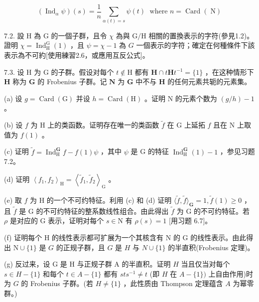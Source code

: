 \documentclass[10pt]{article}
\begin{document}
\[
\left( {{\operatorname{Ind}}_{\alpha }\psi }\right) \left( s\right)  = \frac{1}{n}\mathop{\sum }\limits_{{\alpha \left( t\right)  = s}}\psi \left( t\right) \;\text{ where }n = \operatorname{Card}\left( \mathrm{\;N}\right)
\]

7.2. 設 \(\mathrm{H}\) 為 \(\mathrm{G}\) 的一個子群，且令 \(\chi\) 為與 \(\mathrm{G}/\mathrm{H}\) 相關的置換表示的字符(參見1.2)。證明 \(\chi  = {\operatorname{Ind}}_{\mathrm{H}}^{\mathrm{G}}\left( 1\right)\) ，且 \(\psi  = \chi  - 1\) 為 \(G\) 一個表示的字符；確定在何種條件下該表示為不可約[使用練習2.6，或應用互反公式]。

7.3. 设 \(\mathrm{H}\) 为 \(\mathrm{G}\) 的子群。假设对每个 \(t \notin  \mathrm{H}\) 都有 \(\mathbf{H} \cap  t\mathbf{H}{t}^{-1} = \{ 1\}\) ，在这种情形下 \(\mathbf{H}\) 称为 \(\mathbf{G}\) 的 Frobenius 子群。记 \(\mathbf{N}\) 为 \(\mathbf{G}\) 中不与 \(\mathbf{H}\) 的任何元素共轭的元素集。

(a) 设 \(g = \operatorname{Card}\left( \mathrm{G}\right)\) 并设 \(h = \operatorname{Card}\left( \mathrm{H}\right)\) 。证明 \(\mathrm{N}\) 的元素个数为 \(\left( {g/h}\right)  - 1\) 。

(b) 设 \(f\) 为 \(\mathrm{H}\) 上的类函数。证明存在唯一的类函数 \(\widetilde{f}\) 在 \(\mathrm{G}\) 上延拓 \(f\) 且在 \(\mathrm{N}\) 上取值为 \(f\left( 1\right)\) 。

(c) 证明 \(\widetilde{f} = {\operatorname{Ind}}_{\mathrm{H}}^{\mathbf{G}}f - f\left( 1\right) \psi\) ，其中 \(\psi\) 是 G 的特征 \({\operatorname{Ind}}_{\mathrm{H}}^{\mathbf{G}}\left( 1\right)  - 1\) ，参见习题 7.2。

(d) 证明 \({\left\langle  {f}_{1},{f}_{2}\right\rangle  }_{\mathrm{H}} = {\left\langle  {\widetilde{f}}_{1},{\widetilde{f}}_{2}\right\rangle  }_{\mathrm{G}}\) 。

(e) 取 \(f\) 为 H 的一个不可约特征。利用 (c) 和 (d) 证明 \(\langle \widetilde{f},\widetilde{f}{\rangle }_{\mathbf{G}} = 1,\widetilde{f}\left( 1\right)  \geq  0\) ，且 \(\widetilde{f}\) 是 G 的不可约特征的整系数线性组合。由此得出 \(\widetilde{f}\) 为 G 的不可约特征。若 \(\rho\) 是对应的 G 表示，证明对每个 \(s \in  \mathrm{N}\) 有 \(\rho \left( s\right)  = 1\) [用习题 6.7]。

(f) 证明每个 \(\mathrm{H}\) 的线性表示都可扩展为一个其核含有 \(\mathrm{N}\) 的 \(\mathrm{G}\) 的线性表示。由此得出 \(\mathrm{N} \cup  \{ 1\}\) 是 \(G\) 的正规子群，且 \(G\) 是 \(H\) 与 \(N \cup  \{ 1\}\) 的半直积(Frobenius 定理)。

(g) 反过来，设 G 是 H 与正规子群 A 的半直积。证明 \(H\) 当且仅当对每个 \(s \in  H - \{ 1\}\) 和每个 \(t \in  A - \{ 1\}\) 都有 \({st}{s}^{-1} \neq  t\) (即 \(H\) 在 \(A - \{ 1\} )\) 上自由作用)时为 \(G\) 的 Frobenius 子群。(若 \(H \neq  \{ 1\}\) ，此性质由 Thompson 定理蕴含 \(A\) 为幂零群。)
\end{document}

